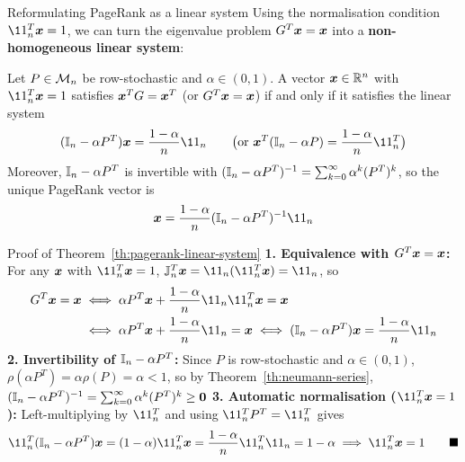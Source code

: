 \documentclass[aspectratio=169]{beamer}\usepackage[]{graphicx}\usepackage[]{xcolor}
\begin{document}

\begin{frame}{Reformulating PageRank as a linear system}
Using the normalisation condition $\11_n^T \bx = 1$, we can turn the eigenvalue problem $G^T\bm{x} = \bm{x}$ into a \textbf{non-homogeneous linear system}:
\vfill
\begin{theorem}
\label{th:pagerank-linear-system}
Let $P \in \mathcal{M}_n$ be row-stochastic and $\alpha \in (0, 1)$. A vector $\bm{x} \in \mathbb{R}^n$ with $\11_n^T \bx = 1$ satisfies $\bm{x}^T G = \bm{x}^T$ (or $G^T\bm{x} = \bm{x}$) if and only if it satisfies the linear system
\[
(\II_n - \alpha P^T)\bx = \frac{1 - \alpha}{n}\11_n \qquad \bigl(\text{or } \bx^T(\II_n - \alpha P) = \frac{1-\alpha}{n}\11_n^T\bigr)
\]
Moreover, $\mathbb{I}_n - \alpha P^T$ is invertible with $(\mathbb{I}_n - \alpha P^T)^{-1} = \sum_{k=0}^\infty \alpha^k (P^T)^k$, so the unique PageRank vector is
\[
\bx = \frac{1 - \alpha}{n} (\II_n - \alpha P^T)^{-1} \11_n
\]
\end{theorem}
\end{frame}

\begin{frame}{Proof of Theorem~\ref{th:pagerank-linear-system}}
\textbf{1. Equivalence with $G^T\bm{x} = \bm{x}$:} For any $\bm{x}$ with $\11_n^T \bx = 1$, $\IJ_n^T \bx = \11_n (\11_n^T \bx) = \11_n$, so
\begin{align*}
G^T\bx = \bx
&\iff \alpha P^T \bx + \frac{1-\alpha}{n}\11_n \11_n^T \bx = \bx \\
&\iff \alpha P^T \bx + \frac{1-\alpha}{n}\11_n = \bx \iff (\II_n - \alpha P^T)\bx = \frac{1-\alpha}{n}\11_n
\end{align*}
\textbf{2. Invertibility of $\mathbb{I}_n - \alpha P^T$:} Since $P$ is row-stochastic and $\alpha \in (0, 1)$, $\rho(\alpha P^T) = \alpha \rho(P) = \alpha < 1$, so by Theorem~\ref{th:neumann-series}, $(\II_n - \alpha P^T)^{-1} = \sum_{k=0}^\infty \alpha^k (P^T)^k \ge \b0$
\vfill
\textbf{3. Automatic normalisation ($\11_n^T \bx = 1$):} Left-multiplying by $\11_n^T$ and using $\11_n^T P^T = \11_n^T$ gives
\[
\11_n^T (\II_n - \alpha P^T)\bx = (1 - \alpha)\11_n^T \bx = \frac{1-\alpha}{n}\11_n^T \11_n = 1 - \alpha \implies \11_n^T \bx = 1 \qquad \blacksquare
\]
\end{frame}
\end{document}

